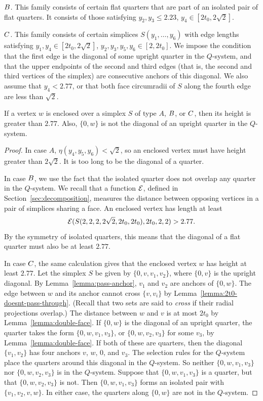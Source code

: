 $B$.  This family consists of certain flat quarters that are
part of an isolated pair of flat quarters. It consists of those
satisfying $y_2,y_3\le 2.23$, $y_4\in[2t_0,2\sqrt{2}]$.

$C$.  This family consists of certain simplices
$S(y_1,\ldots,y_6)$ with edge lengths satisfying
    $y_1,y_4\in[2t_0,2\sqrt{2}]$, $y_2,y_3,y_5,y_6\in[2,2t_0]$.
We impose the condition that the first edge is the diagonal of
some upright quarter in the $Q$-system, and that the upper
endpoints of the second and third edges (that is, the second and
third vertices of the simplex) are consecutive anchors of this
diagonal. We also assume that $y_4< 2.77$, or that both face
circumradii of $S$ along the fourth edge are less than $\sqrt{2}$.

\begin{lemma}
    \label{lemma:2.77}
If a vertex $w$ is enclosed over a simplex $S$ of type $A$, $B$,
or $C$, then its height is greater than $2.77$.  Also, $\{0,w\}$
is not the diagonal of an upright quarter in the $Q$-system.
\end{lemma}

\begin{proof}
In case $A$, $\eta(y_4,y_5,y_6)<\sqrt{2}$, so an enclosed vertex
must have height greater than $2\sqrt{2}$.  It is too long to be
the diagonal of a quarter.

In case $B$, we use the fact that the isolated quarter does not
overlap any quarter in the $Q$-system.  We recall that a function
${\mathcal E}$, defined in Section~\ref{sec:decomposition}, measures the
distance between opposing vertices in a pair of simplices sharing
a face. An enclosed vertex has length at least
    $${\mathcal E}(S(2,2,2,2\sqrt{2},2t_0,2t_0),2t_0,2,2)>2.77.$$
By the symmetry of isolated quarters, this means that the diagonal
of a flat quarter must also be at least $2.77$.

In case $C$, the same calculation gives that the enclosed vertex
$w$ has height at least $2.77$.  Let the simplex $S$ be given by
$\{0,v,v_1,v_2\}$, where $\{0,v\}$ is the upright diagonal. By
Lemma~\ref{lemma:pass-anchor}, $v_1$ and $v_2$ are anchors of
$\{0,w\}$. The edge between $w$ and its anchor cannot cross
$\{v,v_i\}$ by Lemma~\ref{lemma:2t0-doesnt-pass-through}. (Recall
that two sets are said to {\it cross\/} if their radial
projections overlap.) The distance between $w$ and $v$ is at most
$2t_0$ by Lemma~\ref{lemma:double-face}. If $\{0,w\}$ is the
diagonal of an upright quarter, the quarter takes the form
$\{0,w,v_1,v_3\}$, or $\{0,w,v_2,v_3\}$ for some $v_3$, by
Lemma~\ref{lemma:double-face}. If both of these are quarters, then
the diagonal $\{v_1,v_2\}$ has four anchors $v$, $w$, $0$, and
$v_3$. The selection rules for the $Q$-system place the quarters
around this diagonal in the $Q$-system. So neither $\{0,w,v_1,v_3\}$
nor $\{0,w,v_2,v_3\}$ is in the $Q$-system. Suppose that
$\{0,w,v_1,v_3\}$ is a quarter, but that $\{0,w,v_2,v_3\}$ is not.
Then $\{0,w,v_1,v_3\}$ forms an isolated pair with $\{v_1,v_2,v,w\}$.
In either case, the quarters along $\{0,w\}$ are not in the
$Q$-system.
\end{proof}

